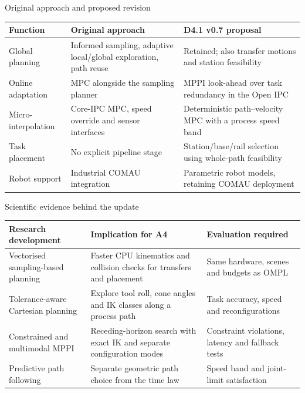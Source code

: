 \documentclass[aspectratio=169,10pt]{beamer}
\begin{document}
\begin{frame}{Original approach and proposed revision}
\small\renewcommand{\arraystretch}{1.3}
\begin{tabularx}{\textwidth}{@{}p{}XX@{}}
\toprule
Function & Original approach & D4.1 v0.7 proposal\\\midrule
Global planning & Informed sampling, adaptive local/global exploration, path reuse & Retained; also transfer motions and station feasibility\\
Online adaptation & MPC alongside the sampling planner & MPPI look-ahead over task redundancy in the Open IPC\\
Micro-interpolation & Core-IPC MPC, speed override and sensor interfaces & Deterministic path--velocity MPC with a process speed band\\
Task placement & No explicit pipeline stage & Station/base/rail selection using whole-path feasibility\\
Robot support & Industrial COMAU integration & Parametric robot models, retaining COMAU deployment\\\bottomrule
\end{tabularx}
\end{frame}

\begin{frame}{Scientific evidence behind the update}
\small\renewcommand{\arraystretch}{1.3}
\begin{tabularx}{\textwidth}{@{}p{}XX@{}}
\toprule
Research development & Implication for A4 & Evaluation required\\\midrule
Vectorised sampling-based planning & Faster CPU kinematics and collision checks for transfers and placement & Same hardware, scenes and budgets as OMPL\\
Tolerance-aware Cartesian planning & Explore tool roll, cone angles and IK classes along a process path & Task accuracy, speed and reconfigurations\\
Constrained and multimodal MPPI & Receding-horizon search with exact IK and separate configuration modes & Constraint violations, latency and fallback tests\\
Predictive path following & Separate geometric path choice from the time law & Speed band and joint-limit satisfaction\\\bottomrule
\end{tabularx}
\end{frame}
\end{document}

